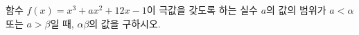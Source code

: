 함수 $f(x)=x^3+ax^2+12x-1$이 극값을 갖도록 하는 실수 $a$의 값의 범위가 $a<\alpha$ 또는 $a>\beta$일 때, $\alpha\beta$의 값을 구하시오.
